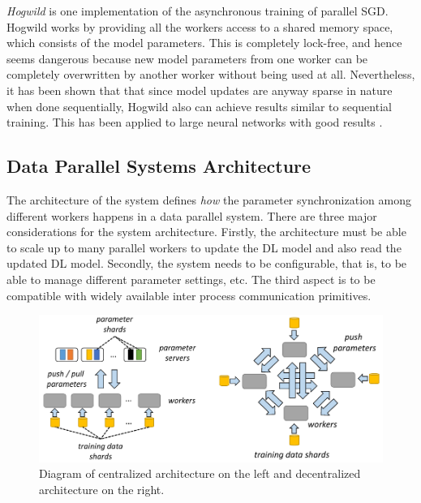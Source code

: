 \emph{Hogwild} \cite{Niu2011HOGWILD:Descent} is one implementation of the asynchronous training of parallel SGD. Hogwild works by providing all the workers access to a shared memory space, which consists of the model parameters. This is completely lock-free, and hence seems dangerous because new model parameters from one worker can be completely overwritten by another worker without being used at all. Nevertheless, it has been shown that that since model updates are anyway sparse in nature when done sequentially, Hogwild also can achieve results similar to sequential training. This has been applied to large neural networks with good results \cite{Deyringer2017ParallelizationHogwild}. 


\subsection{Data Parallel Systems Architecture}
The architecture of the system defines \emph{how} the parameter synchronization among different workers happens in a data parallel system. There are three major considerations for the system architecture. Firstly, the architecture must be able to scale up to many parallel workers to update the DL model and also read the updated DL model. Secondly, the system needs to be configurable, that is, to be able to manage different parameter settings, etc. The third aspect is to be compatible with widely available inter process communication primitives.

\begin{figure}[ht]
  \begin{center}
    \includegraphics[width=\textwidth]{images/architecture_.png} 
    \caption{Diagram of centralized architecture on the left and decentralized architecture on the right.  \cite{Mayer2020ScalableInfrastructures}}
    \label{fig:arch}
  \end{center}
\end{figure}


